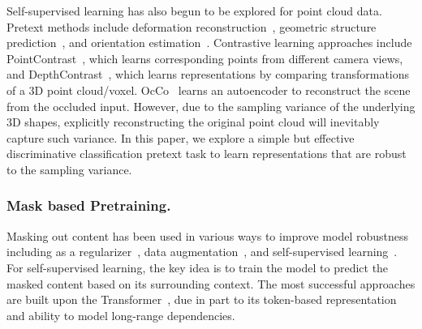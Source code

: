 \documentclass[runningheads]{llncs}
\begin{document}
Self-supervised learning has also begun to be explored for point cloud data. Pretext methods include deformation reconstruction~\cite{achituve2021self}, geometric structure prediction~\cite{thabet2020self}, and orientation estimation~\cite{poursaeed2020self}. Contrastive learning approaches include  PointContrast~\cite{xie2020pointcontrast}, which learns corresponding points from different camera views, and DepthContrast~\cite{Zhang_2021_ICCV}, which learns representations by comparing transformations of a 3D point cloud/voxel.  OcCo~\cite{occo} learns an autoencoder to reconstruct the scene from the occluded input. However, due to the sampling variance of the underlying 3D shapes, explicitly reconstructing the original point cloud will inevitably capture such variance. In this paper, we explore a simple but effective discriminative classification pretext task to learn representations that are robust to the sampling variance.

\vspace{-10pt}
\subsubsection{Mask based Pretraining.}
Masking out content has been used in various ways to improve model robustness including as a regularizer~\cite{dropout,dropblock}, data augmentation~\cite{devries2017improved,singh2017hide,randomerasing}, and self-supervised learning~\cite{chen2022context,devlin-etal-2019-bert,mae}.  For self-supervised learning, the key idea is to train the model to predict the masked content based on its surrounding context.  The most successful approaches are built upon the Transformer~\cite{NIPS2017_3f5ee243}, due in part to its token-based representation and ability to model long-range dependencies.  
\end{document}
